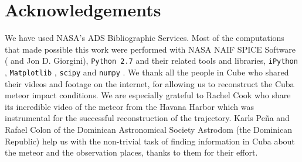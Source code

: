 \documentclass[fleqn,usenatbib]{mnras}
\begin{document}



\section*{Acknowledgements}

We have used NASA's ADS Bibliographic Services. Most of the computations that made possible this work were performed with NASA NAIF SPICE Software (\citealt{Acton1996} and Jon D. Giorgini), {\tt Python 2.7} and their related tools and libraries, {\tt iPython} \citep{Perez2007}, {\tt Matplotlib} \citep{Hunter2007}, {\tt scipy} and {\tt numpy} \citep{Van2011}. We thank all the people in Cube who shared their videos and footage on the internet, for allowing us to reconstruct the Cuba meteor impact conditions.  We are especially grateful to Rachel Cook who share its incredible video of the meteor from the Havana Harbor which was instrumental for the successful reconstruction of the trajectory.  Karls Pe\~na and Rafael Colon of the Dominican Astronomical Society Astrodom (the Dominican Republic) help us with the non-trivial task of finding information in Cuba about the meteor and the observation places, thanks to them for their effort. 
\end{document}
